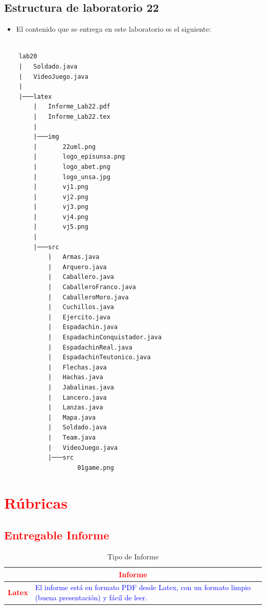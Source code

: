 \documentclass{article}
\newcommand{\itemPracticeNumber}{22}
\begin{document}
\newpage

\subsection{Estructura de laboratorio \itemPracticeNumber} %
\begin{itemize}	
	\item El contenido que se entrega en este laboratorio es el siguiente:
\end{itemize}


\begin{lstlisting}[style=ascii-tree]

    lab20
    |   Soldado.java
    |   VideoJuego.java
    |
    |───latex
        |   Informe_Lab22.pdf
        |   Informe_Lab22.tex
        |
        |───img
        |       22uml.png           
        |       logo_episunsa.png  
        |       logo_abet.png      
        |       logo_unsa.jpg      
        |       vj1.png           
        |       vj2.png           
        |       vj3.png           
        |       vj4.png           
        |       vj5.png           
        |
        |───src
            |   Armas.java
            |   Arquero.java
            |   Caballero.java
            |   CaballeroFranco.java
            |   CaballeroMoro.java
            |   Cuchillos.java
            |   Ejercito.java
            |   Espadachin.java
            |   EspadachinConquistador.java
            |   EspadachinReal.java
            |   EspadachinTeutonico.java
            |   Flechas.java
            |   Hachas.java
            |   Jabalinas.java
            |   Lancero.java
            |   Lanzas.java
            |   Mapa.java
            |   Soldado.java
            |   Team.java
            |   VideoJuego.java
            |───src
                    01game.png

\end{lstlisting}    

\section{\textcolor{red}{Rúbricas}}
	
\subsection{\textcolor{red}{Entregable Informe}}
	\begin{table}[H]
		\caption{Tipo de Informe}
		\setlength{\tabcolsep}{0.5em} %
		{\renewcommand{\arraystretch}{1.5} %
		\begin{tabular}{|p{3cm}|p{12cm}|}
			\hline
			\multicolumn{2}{|c|}{\textbf{\textcolor{red}{Informe}}}  \\
			\hline 
			\textbf{\textcolor{red}{Latex}} & \textcolor{blue}{El informe está en formato PDF desde Latex,  con un formato limpio (buena presentación) y fácil de leer.}   \\ 
			\hline 
		\end{tabular}
	}
	\end{table}
	
\end{document}
